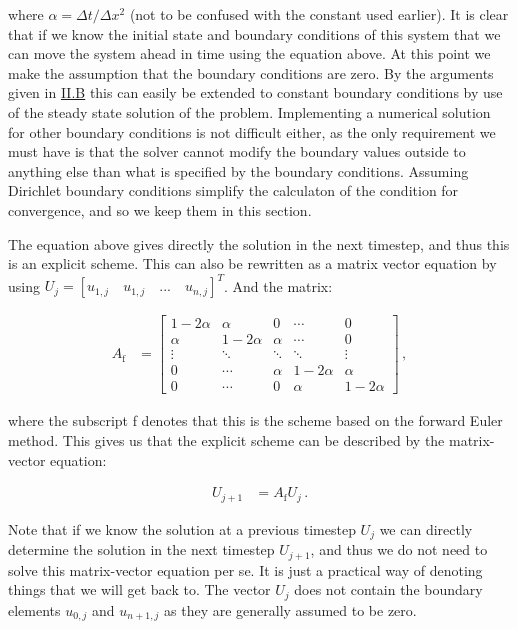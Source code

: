\documentclass[reprint,english,notitlepage]{revtex4-1}  %
\begin{document}
where $\alpha = \Delta t /\Delta x^2$ (not to be confused with the constant used earlier). It is clear that if we know the initial state and boundary conditions of this system that we can move the system ahead in time using the equation above. At this point we make the assumption that the boundary conditions are zero. By the arguments given in \hyperref[sec:formalism_1D_diff_eq_analytical]{II.B} this can easily be extended to constant boundary conditions by use of the steady state solution of the problem. Implementing a numerical solution for other boundary conditions is not difficult either, as the only requirement we must have is that the solver cannot modify the boundary values outside to anything else than what is specified by the boundary conditions. Assuming Dirichlet boundary conditions simplify the calculaton of the condition for convergence, and so we keep them in this section.

The equation above gives directly the solution in the next timestep, and thus this is an explicit scheme. This can also be rewritten as a matrix vector equation by using $U_j = [u_{1,j} \quad u_{1,j} \quad ... \quad u_{n,j} ] ^T$. And the matrix:

\begin{align*}
A_\text{f} &= \begin{bmatrix}
1 - 2\alpha & \alpha & 0   &\cdots & 0 \\
\alpha & 1-2\alpha & \alpha   & \cdots & 0 \\
\vdots & \ddots & \ddots & \ddots  & \vdots \\
0 & \cdots  & \alpha & 1 - 2\alpha & \alpha \\
0 & \cdots & 0 & \alpha & 1 - 2\alpha 
\end{bmatrix} \, ,
\end{align*}

where the subscript f denotes that this is the scheme based on the forward Euler method. This gives us that the explicit scheme can be described by the matrix-vector equation:

\begin{align*}
U_{j+1} &= A_\text{f} U_{j} \, .
\end{align*}

Note that if we know the solution at a previous timestep $U_j$ we can directly determine the solution in the next timestep $U_{j+1}$, and thus we do not need to solve this matrix-vector equation per se. It is just a practical way of denoting things that we will get back to. The vector $U_j$ does not contain the boundary elements $u_{0,j}$ and $u_{n+1,j}$ as they are generally assumed to be zero.
\end{document}
